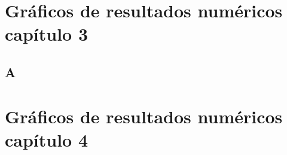 \chapter{Gráficos de resultados numéricos capítulo 3}

\section{A}


\chapter{Gráficos de resultados numéricos capítulo 4}

\subsection{}

